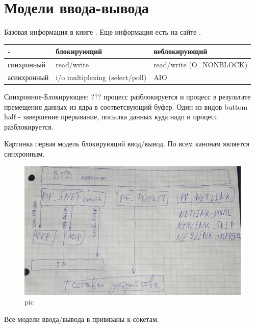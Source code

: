 \chapter{Модели ввода-вывода}
Базовая информация в книге \cite{UNIX_Stiv_net_app}.
Еще информация есть на сайте \cite{IBM_models_io}.

\begin{table}[H]
\begin{tabular}{|l|l|l|}
\hline
- & блокирующий & неблокирующий\\
\hline
синхронный & read/write & read/write (O\_NONBLOCK)\\
\hline
асинхронный & i/o multiplexing (select/poll) & AIO\\
\hline
\end{tabular}
\end{table}

Синхронное-Блокирующее: ??? процесс разблокируется и процесс в результате премещения данных из ядра в соответсвующий буфер. Один из видов buttom half - завершение прерывание, посылка данных куда надо и процесс разблокируется. 

Картинка первая модель блокирующий ввод/вывод. По всем канонам является синхронным. 

\begin{figure}[H]
  \centering
  \includegraphics[width=\textwidth]{pic/3.png}
  \caption{pic}
\end{figure}

Все модели ввода/вывода в \cite{UNIX_Stiv_net_app} привязаны к сокетам.

